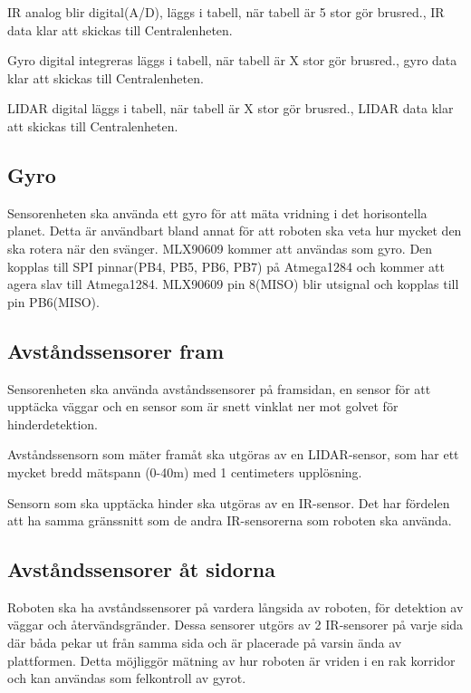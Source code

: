 \documentclass[a4paper,titlepage,12pt]{article}
\begin{document}
	IR analog blir digital(A/D), läggs i tabell, när tabell är 5 stor gör brusred., 
	IR data klar att skickas till Centralenheten.
	
	Gyro digital integreras läggs i tabell, när tabell är X stor gör brusred., 
	gyro data klar att skickas till Centralenheten. 

	LIDAR digital läggs i tabell, när tabell är X stor gör brusred., 
	LIDAR data klar att skickas till Centralenheten. 
	

	\subsection{Gyro}
	
	Sensorenheten ska använda ett gyro för att mäta vridning i det horisontella
	planet. Detta är användbart bland annat för att roboten ska veta hur mycket
	den ska rotera när den svänger. MLX90609 kommer att användas som gyro. Den kopplas till SPI 
	pinnar(PB4, PB5, PB6, PB7) på Atmega1284 och kommer att agera slav till Atmega1284. 
	MLX90609 pin 8(MISO) blir utsignal och kopplas till pin PB6(MISO). 
	
	\subsection{Avståndssensorer fram}
	
	Sensorenheten ska använda avståndssensorer på framsidan, en sensor för att
	upptäcka väggar och en sensor som är snett vinklat ner mot golvet för hinderdetektion. 

	Avståndssensorn som mäter framåt ska utgöras av en LIDAR-sensor, som har
    ett mycket bredd mätspann (0-40m) med 1 centimeters upplösning.

	Sensorn som ska upptäcka hinder ska utgöras av en IR-sensor. Det
	har fördelen att ha samma gränssnitt som de andra IR-sensorerna som roboten
	ska använda.

	\subsection{Avståndssensorer åt sidorna}
	Roboten ska ha avståndssensorer på vardera långsida av roboten, för
	detektion av väggar och återvändsgränder. Dessa sensorer utgörs av 2
    IR-sensorer på varje sida där båda pekar ut från samma sida och
	är placerade på varsin ända av plattformen. Detta möjliggör mätning av hur
	roboten är vriden i en rak korridor och kan användas som felkontroll av
	gyrot.
	
	\newpage{}
\end{document}
